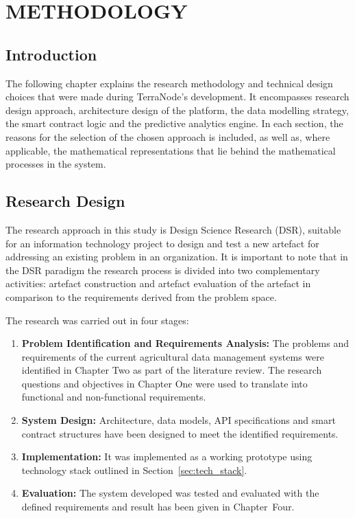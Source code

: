 \chapter{METHODOLOGY}

\section{Introduction}

The following chapter explains the research methodology and technical design choices that were made during TerraNode's development. It encompasses research design approach, architecture design of the platform, the data modelling strategy, the smart contract logic and the predictive analytics engine. In each section, the reasons for the selection of the chosen approach is included, as well as, where applicable, the mathematical representations that lie behind the mathematical processes in the system.

\section{Research Design}

The research approach in this study is Design Science Research (DSR), suitable for an information technology project to design and test a new artefact for addressing an existing problem in an organization. It is important to note that in the DSR paradigm the research process is divided into two complementary activities: artefact construction and artefact evaluation of the artefact in comparison to the requirements derived from the problem space.

The research was carried out in four stages:

\begin{enumerate}[label=(\roman*)]
    \item \textbf{Problem Identification and Requirements Analysis:} The problems and requirements of the current agricultural data management systems were identified in Chapter Two as part of the literature review. The research questions and objectives in Chapter One were used to translate into functional and non-functional requirements.
    \item \textbf{System Design:} Architecture, data models, API specifications and smart contract structures have been designed to meet the identified requirements.
    \item \textbf{Implementation:} It was implemented as a working prototype using technology stack outlined in Section~\ref{sec:tech_stack}.
    \item \textbf{Evaluation:} The system developed was tested and evaluated with the defined requirements and result has been given in Chapter~Four.
\end{enumerate}

